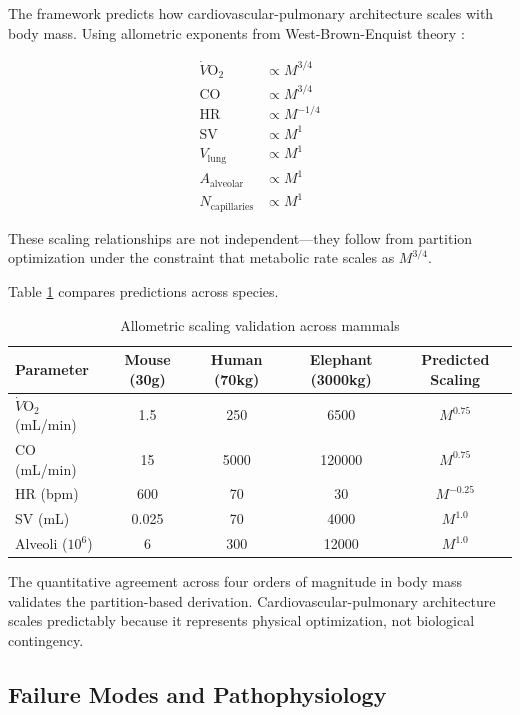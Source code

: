 \documentclass[12pt,a4paper]{article}
\theoremstyle{remark}
\begin{document}
The framework predicts how cardiovascular-pulmonary architecture scales with body mass. Using allometric exponents from West-Brown-Enquist theory \cite{west1997general}:

\begin{align}
\dot{V}\mathrm{O}_{2} &\propto M^{3/4} \\
\mathrm{CO} &\propto M^{3/4} \\
\mathrm{HR} &\propto M^{-1/4} \\
\mathrm{SV} &\propto M^{1} \\
V_{\mathrm{lung}} &\propto M^{1} \\
A_{\mathrm{alveolar}} &\propto M^{1} \\
N_{\mathrm{capillaries}} &\propto M^{1}
\end{align}

These scaling relationships are not independent—they follow from partition optimization under the constraint that metabolic rate scales as $M^{3/4}$.

Table \ref{tab:allometric_validation} compares predictions across species.

\begin{table}[h]
\centering
\caption{Allometric scaling validation across mammals}
\label{tab:allometric_validation}
\begin{tabular}{lcccc}
\toprule
\textbf{Parameter} & \textbf{Mouse (30g)} & \textbf{Human (70kg)} & \textbf{Elephant (3000kg)} & \textbf{Predicted Scaling} \\
\midrule
$\dot{V}\mathrm{O}_{2}$ (mL/min) & 1.5 & 250 & 6500 & $M^{0.75}$ \\
CO (mL/min) & 15 & 5000 & 120000 & $M^{0.75}$ \\
HR (bpm) & 600 & 70 & 30 & $M^{-0.25}$ \\
SV (mL) & 0.025 & 70 & 4000 & $M^{1.0}$ \\
Alveoli ($10^{6}$) & 6 & 300 & 12000 & $M^{1.0}$ \\
\bottomrule
\end{tabular}
\end{table}

The quantitative agreement across four orders of magnitude in body mass validates the partition-based derivation. Cardiovascular-pulmonary architecture scales predictably because it represents physical optimization, not biological contingency.

\subsection{Failure Modes and Pathophysiology}
\end{document}

